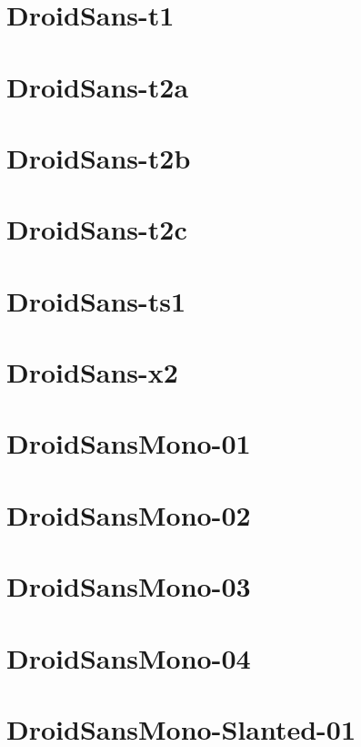 \documentclass{article}
\begin{document}
\section{DroidSans-t1}

\section{DroidSans-t2a}

\section{DroidSans-t2b}

\section{DroidSans-t2c}

\section{DroidSans-ts1}

\section{DroidSans-x2}

\section{DroidSansMono-01}

\section{DroidSansMono-02}

\section{DroidSansMono-03}

\section{DroidSansMono-04}

\section{DroidSansMono-Slanted-01}
\end{document}
